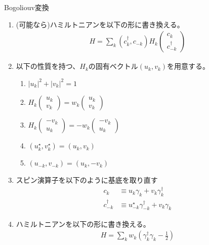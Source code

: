 \documentclass[a4paper,10.5pt]{article}
\numberwithin{equation}{section}
\begin{document}
\begin{setupbox}{Bogoliouv変換}
\begin{enumerate}
    \item (可能なら)ハミルトニアンを以下の形に書き換える。
    \begin{align*}
    H=\sum_{k}(c_{k}^{\dagger},c_{-k})H_{k}
       \begin{pmatrix}
           c_{k} \\ c_{-k}^{\dagger}
       \end{pmatrix}
    \end{align*}
    \item 以下の性質を持つ、$H_{k}$の固有ベクトル$(u_{k},v_{k})$を用意する。 
    \begin{enumerate}
        \item $|u_{k}|^{2}+|v_{k}|^{2}=1$
        \item $H_{k}\begin{pmatrix}
            u_{k}\\ v_{k}
        \end{pmatrix}=w_{k}\begin{pmatrix}
            u_{k}\\ v_{k}
        \end{pmatrix}$
        \item $H_{k}\begin{pmatrix}
            -v_{k}\\ u_{k}
        \end{pmatrix}=-w_{k}\begin{pmatrix}
            -v_{k}\\ u_{k}
        \end{pmatrix}$
        \item $(u_{k}^{\star},v_{k}^{\star})=(u_{k},v_{k})$
        \item $(u_{-k},v_{-k})=(u_{k},-v_{k})$
    \end{enumerate}
    \item スピン演算子を以下のように基底を取り直す
    \begin{align*}
        c_{k}&\equiv u_{k}\gamma_{k}+v_{k}\gamma^{\dagger}_{k}\\
        c_{-k}^{\dagger}&\equiv u^{\star}_{-k}\gamma^{\dagger}_{-k}+v_{k}\gamma_{k}
    \end{align*}
    \item ハミルトニアンを以下の形に書き換える。
    \begin{align*}
        H=\sum_{k}w_{k}(\gamma_{k}^{\dagger}\gamma_{k}-\frac{1}{2})
    \end{align*}
\end{enumerate}
\end{setupbox}
\end{document}
